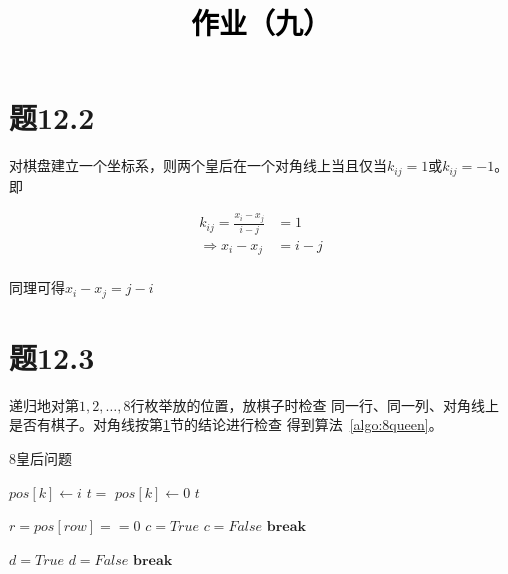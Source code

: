 \documentclass[a4paper,twoside]{article}
\newcommand{\PaperTitle}{作业（九）}  %
\begin{document}
\newpage

\title{
	\Large{\textcolor{black}{\PaperTitle}}
}
	
	
\maketitle
	
\tableofcontents
 
\newpage
\setcounter{page}{1}

\begin{spacing}{1.2}

\section{题12.2}
\label{sec:t12.2}

对棋盘建立一个坐标系，则两个皇后在一个对角线上当且仅当$k_{ij}=1$或$k_{ij}=-1$。即

\begin{align*}
	k_{ij}=\frac{x_i-x_j}{i-j}&=1 \\
	\Rightarrow x_i-x_j&=i-j \\
\end{align*}

同理可得$x_i-x_j=j-i$

\section{题12.3}

递归地对第$1,2,\ldots,8$行枚举放的位置，放棋子时检查
同一行、同一列、对角线上是否有棋子。对角线按第\ref{sec:t12.2}节的结论进行检查
得到算法~\ref{algo:8queen}。


\begin{algorithm}[htbp]
	\caption{8皇后问题}
	\label{algo:8queen}
	\begin{algorithmic}[1]
				\State {}
			\EndIf
					\State $pos[k]\gets i$
					\State $t=$ 
					\State $pos[k]\gets 0$
				\EndIf
			\EndFor
			\State \Return $t$
		\EndProcedure

			\State $r=pos[row]==0$	
			\State $c=True$
					\State $c=False$
					\State $\mathbf{break}$
				\EndIf
			\EndFor	

			\State $d=True$
							\State $d=False$
							\State $\mathbf{break}$
						\EndIf
					\EndIf
				\EndFor
			\EndFor


\end{algorithmic}
\end{algorithm}
\end{spacing}
\end{document}
